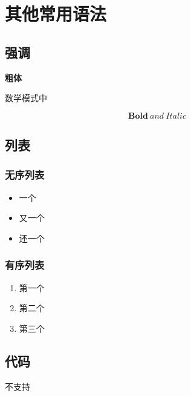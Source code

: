 \chapter{其他常用语法}

\section{强调}

\textbf{粗体}

数学模式中

$$
    \mathbf{Bold} \ and \ \mathit{Italic}
$$

\section{列表}

\subsection{无序列表}

\begin{itemize}
    \item 一个
    \item 又一个
    \item 还一个
\end{itemize}

\subsection{有序列表}

\begin{enumerate}
    \item 第一个
    \item 第二个
    \item 第三个
\end{enumerate}

\section{代码}

不支持



